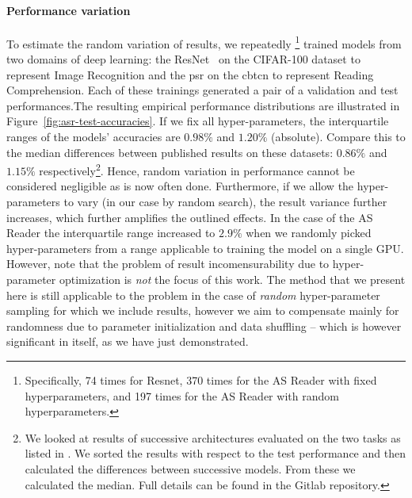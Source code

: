 \documentclass{article}
\newcommand{\asr}{\gls{psr}\xspace}
\newcommand{\cbtcn}{\gls{cbtcn}\xspace}
\newcommand{\dl}{deep learning\xspace}
\begin{document}
\paragraph{Performance variation} To estimate the random variation of results, we repeatedly
\footnote{Specifically, 74 times for Resnet, 370 times for the AS Reader with fixed hyperparameters, and 197 times for the AS Reader with random hyperparameters.} 
trained models from two domains of \dl: the ResNet~\citep{he2016deep} on the CIFAR-100 dataset \citep{krizhevsky2009learning} to represent Image Recognition and the \asr \citep{Kadlec2016} on the \cbtcn \citep{hill2015goldilocks} to represent Reading Comprehension. Each of these trainings generated a pair of a validation and test performances.The resulting empirical performance distributions are illustrated in Figure~\ref{fig:asr-test-accuracies}. If we fix all hyper-parameters, the interquartile ranges of the models' accuracies are $0.98\%$ and $1.20\%$ (absolute). Compare this to the median differences between published results on these datasets: $0.86\%$ and $1.15\%$ respectively\footnote{We looked at results of successive architectures evaluated on the two tasks as listed in \cite{huang2016densely, munkhdalai2016reasoning}. We sorted the results with respect to the test performance and then calculated the differences between successive models. From these we calculated the median. Full details can be found in the Gitlab repository.}. Hence, random variation in performance cannot be considered negligible as is now often done.
Furthermore, if we allow the hyper-parameters to vary (in our case by random search), the result variance further increases, which further amplifies the outlined effects. In the case of the AS Reader the interquartile range increased to $2.9\%$ when we randomly picked hyper-parameters from a range applicable to training the model on a single GPU. However, note that the problem of result incomensurability due to hyper-parameter optimization is \emph{not} the focus of this work. The method that we present here is still applicable to the problem in the case of \emph{random} hyper-parameter sampling for which we include results, however we aim to compensate mainly for randomness due to parameter initialization and data shuffling -- which is however significant in itself, as we have just demonstrated. 

\end{document}
